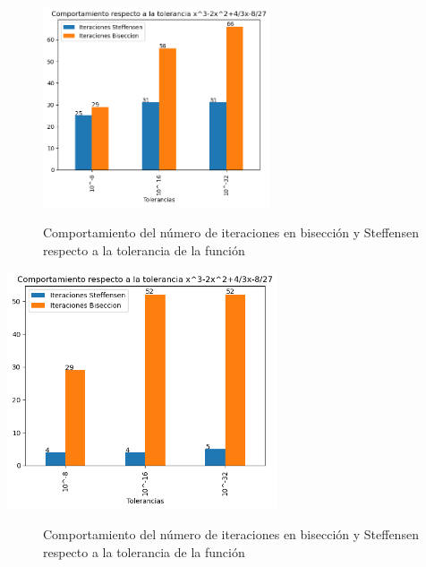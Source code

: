 \documentclass[]{hdsr}
\begin{document}
    \begin{center}
        \begin{figure}[h]
            \includegraphics[width=0.6\textwidth]{figs/polinomio.png} 
            \caption{}
            \label{fig:my_label7}
            Comportamiento del número de iteraciones en bisección y Steffensen respecto a la tolerancia de la función \\
        \end{figure}
    \end{center}
    \hfill
    
    
     \begin{center}
        \includegraphics[width=0.6\textwidth]{figs/coseno.png} 
        \begin{figure}[h]
            \centering
            \caption{}
            \label{fig:my_label6}
            Comportamiento del número de iteraciones en bisección y Steffensen respecto a la tolerancia de la función \\
        \end{figure}
    \end{center}
    \hfill
    
\end{document}
